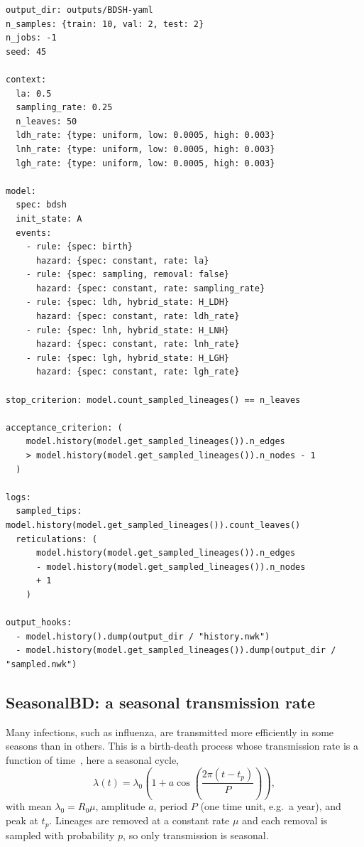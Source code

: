 \documentclass[11pt]{article}
\begin{document}
\begin{lstlisting}[style=cfg]
output_dir: outputs/BDSH-yaml
n_samples: {train: 10, val: 2, test: 2}
n_jobs: -1
seed: 45

context:
  la: 0.5
  sampling_rate: 0.25
  n_leaves: 50
  ldh_rate: {type: uniform, low: 0.0005, high: 0.003}
  lnh_rate: {type: uniform, low: 0.0005, high: 0.003}
  lgh_rate: {type: uniform, low: 0.0005, high: 0.003}

model:
  spec: bdsh
  init_state: A
  events:
    - rule: {spec: birth}
      hazard: {spec: constant, rate: la}
    - rule: {spec: sampling, removal: false}
      hazard: {spec: constant, rate: sampling_rate}
    - rule: {spec: ldh, hybrid_state: H_LDH}
      hazard: {spec: constant, rate: ldh_rate}
    - rule: {spec: lnh, hybrid_state: H_LNH}
      hazard: {spec: constant, rate: lnh_rate}
    - rule: {spec: lgh, hybrid_state: H_LGH}
      hazard: {spec: constant, rate: lgh_rate}

stop_criterion: model.count_sampled_lineages() == n_leaves

acceptance_criterion: (
    model.history(model.get_sampled_lineages()).n_edges
    > model.history(model.get_sampled_lineages()).n_nodes - 1
  )

logs:
  sampled_tips: model.history(model.get_sampled_lineages()).count_leaves()
  reticulations: (
      model.history(model.get_sampled_lineages()).n_edges
      - model.history(model.get_sampled_lineages()).n_nodes
      + 1
    )

output_hooks:
  - model.history().dump(output_dir / "history.nwk")
  - model.history(model.get_sampled_lineages()).dump(output_dir / "sampled.nwk")
\end{lstlisting}

\subsection{SeasonalBD: a seasonal transmission rate}
\label{sec:seasonal-bd}

Many infections, such as influenza, are transmitted more efficiently in some
seasons than in others. This is a birth-death process whose transmission rate is
a function of time~\citep{kendall1948generalized}, here a seasonal cycle,
\begin{equation*}
  \lambda(t) = \lambda_0\left(1 + a\cos\left(\frac{2\pi(t - t_p)}{P}\right)\right),
\end{equation*}
with mean $\lambda_0 = R_0\mu$, amplitude $a$, period $P$ (one time unit, e.g.\
a year), and peak at $t_p$. Lineages are removed at a constant rate $\mu$ and
each removal is sampled with probability $p$, so only transmission is seasonal.
\end{document}
